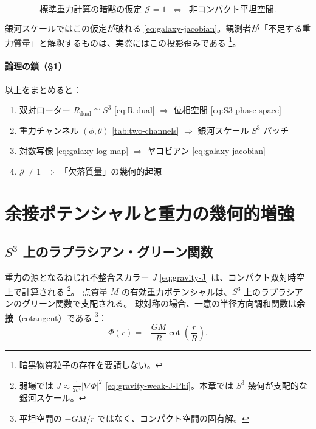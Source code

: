 \documentclass[dvipdfmx,a4paper,oneside]{jsbook}
\numberwithin{equation}{chapter}
\begin{document}
\begin{equation}
  \boxed{\;
  \text{標準重力計算の暗黙の仮定 } \mathcal{J} = 1
  \;\;\Longleftrightarrow\;\;
  \text{非コンパクト平坦空間}.
  \;}
  \label{eq:galaxy-J-equals-one}
\end{equation}

銀河スケールではこの仮定が破れる \eqref{eq:galaxy-jacobian}。観測者が「不足する重力質量」と解釈するものは、実際にはこの投影歪みである \footnote{暗黒物質粒子の存在を要請しない。}。

\paragraph{論理の鎖（§1）}
以上をまとめると：
\begin{enumerate}[leftmargin=2em]
  \item 双対ローター \(R_{\mathrm{dual}} \cong S^3\) \eqref{eq:R-dual} \(\Rightarrow\) 位相空間 \eqref{eq:S3-phase-space}
  \item 重力チャンネル \((\phi, \theta)\) \eqref{tab:two-channels} \(\Rightarrow\) 銀河スケール \(S^3\) パッチ
  \item 対数写像 \eqref{eq:galaxy-log-map} \(\Rightarrow\) ヤコビアン \eqref{eq:galaxy-jacobian}
  \item \(\mathcal{J} \neq 1\) \(\Rightarrow\) 「欠落質量」の幾何的起源
\end{enumerate}

\section{余接ポテンシャルと重力の幾何的増強}

\subsection{\(S^3\) 上のラプラシアン・グリーン関数}

重力の源となるねじれ不整合スカラー \(J\) \eqref{eq:gravity-J} は、コンパクト双対時空上で計算される \footnote{弱場では \(J \approx \tfrac{1}{2c^4}|\nabla\Phi|^2\) \eqref{eq:gravity-weak-J-Phi}。本章では \(S^3\) 幾何が支配的な銀河スケール。}。
点質量 \(M\) の有効重力ポテンシャルは、\(S^3\) 上のラプラシアンのグリーン関数で支配される。
球対称の場合、一意の半径方向調和関数は\textbf{余接}（cotangent）である \footnote{平坦空間の \(-GM/r\) ではなく、コンパクト空間の固有解。}：
\begin{equation}
  \Phi(r) = -\frac{GM}{R}\cot\!\left(\frac{r}{R}\right).
  \label{eq:galaxy-cot-potential}
\end{equation}
\end{document}

